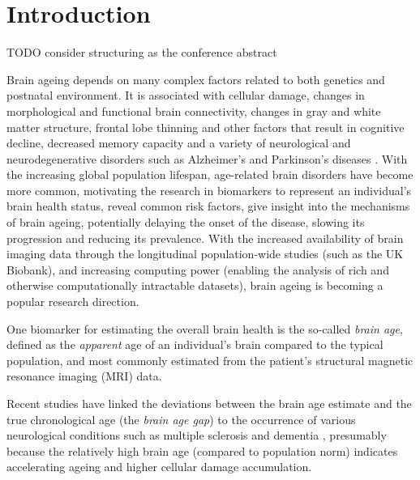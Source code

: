 \chapter{Introduction}



TODO consider structuring as the conference abstract

Brain ageing depends on many complex factors related to both genetics and postnatal environment. It is associated with cellular damage, changes in morphological and functional brain connectivity, changes in gray and white matter structure, frontal lobe thinning and other factors that result in cognitive decline, decreased memory capacity and a variety of neurological and neurodegenerative disorders such as Alzheimer's and Parkinson's diseases \cite{cole2018brain, niu2019improved, franke2019ten}. With the increasing global population lifespan, age-related brain disorders have become more common, motivating the research in biomarkers to represent an individual's brain health status, reveal common risk factors, give insight into the mechanisms of brain ageing, potentially delaying the onset of the disease, slowing its progression and reducing its prevalence. With the increased availability of brain imaging data through the longitudinal population-wide studies (such as the UK Biobank), and increasing computing power (enabling the analysis of rich and otherwise computationally intractable datasets), brain ageing is becoming a popular research direction.

One biomarker for estimating the overall brain health is the so-called \textit{brain age}, defined as the \textit{apparent} age of an individual's brain compared to the typical population, and most commonly estimated from the patient's structural magnetic resonance imaging (MRI) data.

Recent studies have linked the deviations between the brain age estimate and the true chronological age (the \textit{brain age gap}) to the occurrence of various neurological conditions such as multiple sclerosis and dementia \cite{kaufmann2019}, presumably because the relatively high brain age (compared to population norm) indicates accelerating ageing and higher cellular damage accumulation.

